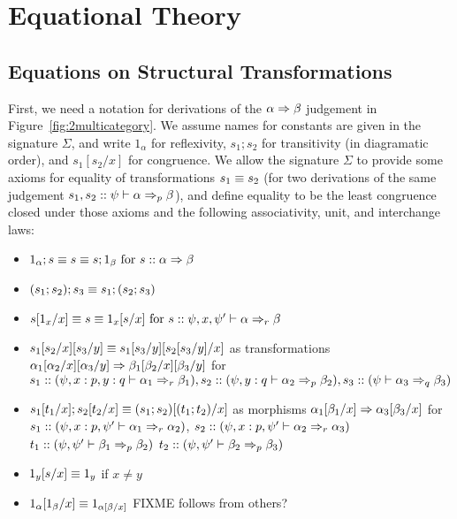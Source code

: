 \section{Equational Theory}
\label{sec:equational}

\subsection{Equations on Structural Transformations}

First, we need a notation for derivations of the $\alpha \spr \beta$
judgement in Figure~\ref{fig:2multicategory}.  We assume names for
constants are given in the signature $\Sigma$, and write $1_\alpha$ for
reflexivity, $s_1;s_2$ for transitivity (in diagramatic order), and
$s_1[s_2/x]$ for congruence.  We allow the signature $\Sigma$ to provide
some axioms for equality of transformations $s_1 \deq s_2$ (for two
derivations of the same judgement $s_1,s_2 ::
\wfsp{\psi}{\alpha}{\beta}{p}$), and define equality to be the least
congruence closed under those axioms and the following associativity,
unit, and interchange laws:

\begin{itemize}
\item $1_\alpha;s \deq s \deq s;1_\beta \text{ for } s :: \alpha \spr \beta$
\item $(s_1;s_2);s_3 \deq s_1;(s_2;s_3)$
\item $s[1_x/x] \deq s \deq 1_x[s/x] \text{ for } s :: \wfsp{\psi,x,\psi'}{\alpha}{\beta}{r}$
\item $\subst{\subst{s_1}{s_2}{x}}{s_3}{y} \deq
\subst{\subst{s_1}{s_3}{y}}{\subst{s_2}{s_3}{y}}{x}$ as transformations
${\subst{\subst{\alpha_1}{\alpha_2}{x}}{\alpha_3}{y}} \spr
{\subst{\subst{\beta_1}{\beta_2}{x}}{\beta_3}{y}}$ for $s_1 :: (\wfsp{\psi,x:p,y:q}{\alpha_1}{\beta_1}{r}), 
 s_2 :: (\wfsp{\psi,y:q}{\alpha_2}{\beta_2}{p}), 
 s_3 :: (\wfsp{\psi}{\alpha_3}{\beta_3}{q})$ 
\item $s_1[t_1/x];s_2[t_2/x] \deq (s_1;s_2)[(t_1;t_2)/x]$
as morphisms $\alpha_1[\beta_1/x] \spr \alpha_3[\beta_3/x]$
for $s_1 :: (\wfsp{\psi,x:p,\psi'}{\alpha_1}{\alpha_2}{r})$,
 $s_2 :: (\wfsp{\psi,x:p,\psi'}{\alpha_2}{\alpha_3}{r})$
 $t_1 :: (\wfsp{\psi,\psi'}{\beta_1}{\beta_2}{p})$
 $t_2 :: (\wfsp{\psi,\psi'}{\beta_2}{\beta_3}{p})$
\item $1_y[s/x] \deq 1_y$ if $x \neq y$
\item $\subst{1_\alpha}{1_\beta}{x} \deq 1_{\subst{\alpha}{\beta}{x}}$
  FIXME follows from others?
\end{itemize}


